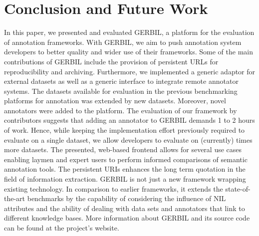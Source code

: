 \section{Conclusion and Future Work}
\label{cha332:sec:conclusion}
In this paper, we presented and evaluated GERBIL, a platform for the evaluation of annotation frameworks. With GERBIL, we aim to push annotation system developers to better quality and wider use of their frameworks.
Some of the main contributions of GERBIL include the provision of persistent URLs for reproducibility and archiving.
Furthermore, we implemented a generic adaptor for external datasets as well as a generic interface to integrate remote annotator systems.
The datasets available for evaluation in the previous benchmarking platforms for annotation was extended by \numberOfadditionalDatasets new datasets. Moreover, \numberOfadditionalAnnotators novel annotators were added to the platform. 
The evaluation of our framework by contributors suggests that adding an annotator to GERBIL demands 1 to 2 hours of work. Hence, while keeping the implementation effort previously required to evaluate on a single dataset, we allow developers to evaluate on (currently) \overalldatasets times more datasets.
The presented, web-based frontend allows for several use cases enabling laymen and expert users to perform informed  comparisons of semantic annotation tools.
The persistent URIs enhances the long term quotation in the field of information extraction.
GERBIL is not just a new framework wrapping existing technology. 
In comparison to earlier frameworks, it extends the state-of-the-art benchmarks by the capability of considering the influence of NIL attributes and the ability of dealing with data sets and annotators that link to different knowledge bases.
More information about GERBIL and its source code can be found at the project's website. 



